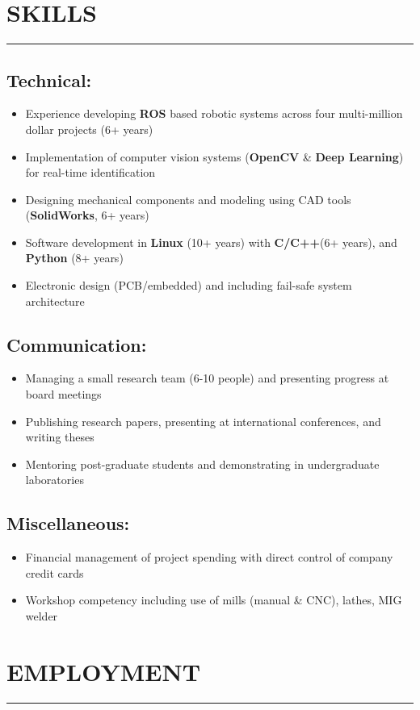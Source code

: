 \documentclass[english]{extarticle}
\newcommand{\mySect}[2]{
    \section*{\textcolor{secondary}{#1}\hfill{\footnotesize\textmd{{#2}}}}
    \vspace{-2em}
    \textcolor{tertiary}{\hrule}
    \vspace{0.5em}
}
\begin{document}
\mySect{SKILLS}{}

\subsection*{Technical:}
\begin{itemize}
    \item {Experience developing \textbf{ROS} based robotic systems across four multi-million dollar projects (6+ years)}
    \item {Implementation of computer vision systems (\textbf{OpenCV} \& \textbf{Deep Learning}) for real-time identification}
    \item {Designing mechanical components and modeling using CAD tools (\textbf{SolidWorks}, 6+ years)}
    \item {Software development in \textbf{Linux} (10+ years) with \textbf{C/C++}(6+ years), and \textbf{Python} (8+ years)}
    \item {Electronic design (PCB/embedded) and including fail-safe system architecture}
\end{itemize}

\subsection*{Communication:}
\begin{itemize}
    \item {Managing a small research team (6-10 people) and presenting progress at board meetings}
    \item {Publishing research papers, presenting at international conferences, and writing theses}
    \item {Mentoring post-graduate students and demonstrating in undergraduate laboratories}
\end{itemize}

\subsection*{Miscellaneous:}
\begin{itemize}
    \item {Financial management of project spending with direct control of company credit cards}
    \item {Workshop competency including use of mills (manual \& CNC), lathes, MIG welder}
\end{itemize}
\mySect{EMPLOYMENT}{}
\end{document}
